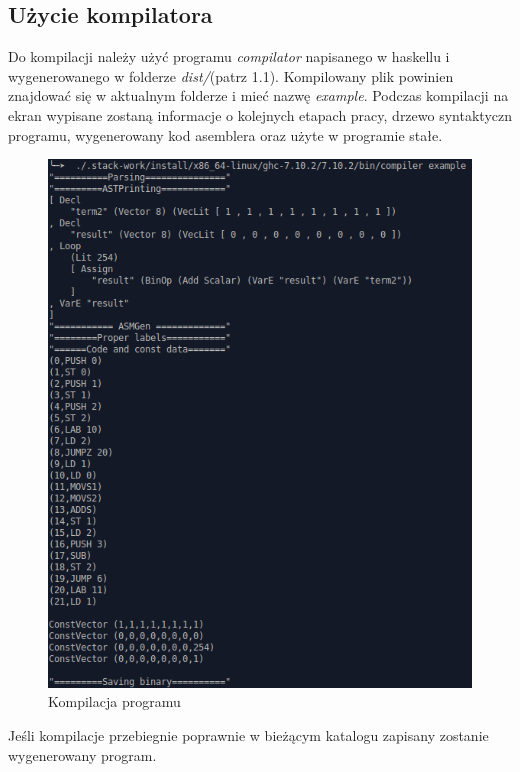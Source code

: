 \subsection{Użycie kompilatora}
Do kompilacji należy użyć programu \textit{compilator} napisanego w haskellu i wygenerowanego w folderze \textit{dist/}(patrz 1.1). Kompilowany plik powinien znajdować się w aktualnym folderze i mieć nazwę \textit{example}.
Podczas kompilacji na ekran wypisane zostaną informacje o kolejnych etapach pracy, drzewo syntaktyczn programu, wygenerowany kod asemblera oraz użyte w programie stałe.
\begin{figure}[!h]
\centering
\includegraphics[scale=0.75]{images/kompilator}
\caption{Kompilacja programu}
\end{figure}\clearpage
Jeśli kompilacje przebiegnie poprawnie w bieżącym katalogu zapisany zostanie wygenerowany program.


